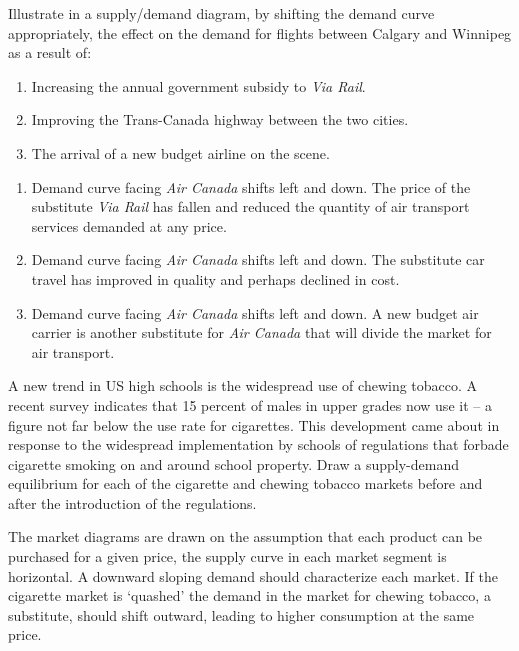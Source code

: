 \begin{enumialphparenastyle}
\begin{econex}\label{ex:ch3ex2}
Illustrate in a supply/demand diagram, by shifting the demand curve appropriately, the effect on the demand for flights between Calgary and Winnipeg as a result of:
\begin{enumerate}
	\item	Increasing the annual government subsidy to \textit{Via Rail}.
	\item	Improving the Trans-Canada highway between the two cities.
	\item	The arrival of a new budget airline on the scene.
\end{enumerate}
\begin{econsolution}
\begin{enumerate}
	\item	Demand curve facing \textit{Air Canada} shifts left and down. The price of the substitute \textit{Via Rail} has fallen and reduced the quantity of air transport services demanded at any price.
	\item	Demand curve facing \textit{Air Canada} shifts left and down. The substitute car travel has improved in quality and perhaps declined in cost.
	\item	Demand curve facing \textit{Air Canada} shifts left and down. A new budget air carrier is another substitute for \textit{Air Canada} that will divide the market for air transport.
\end{enumerate}
\end{econsolution}
\end{econex}

\begin{econex}\label{ex:ch3ex3}
A new trend in US high schools is the widespread use of chewing tobacco. A recent survey indicates that 15 percent of males in upper grades now use it -- a figure not far below the use rate for cigarettes. This development came about in response to the widespread implementation by schools of regulations that forbade cigarette smoking on and around school property. Draw a supply-demand equilibrium for each of the cigarette and chewing tobacco markets before and after the introduction of the regulations.
\begin{econsolution}
	The market diagrams are drawn on the assumption that each product can be purchased for a given price, the supply curve in each market
	segment is horizontal. A downward sloping demand should characterize each market. If the cigarette market is `quashed' the demand in
	the market for chewing tobacco, a substitute, should shift outward, leading to higher consumption at the same price.
	

\end{econsolution}
\end{econex}
\end{enumialphparenastyle}
